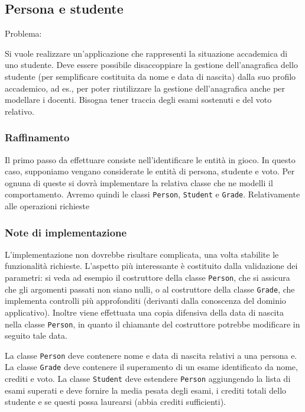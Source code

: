 \documentclass{article}
\begin{document}
\subsection{Persona e studente}

Problema:

Si vuole realizzare un'applicazione che rappresenti la situazione accademica di uno studente.
Deve essere possibile disaccoppiare la gestione dell'anagrafica dello studente (per semplificare
costituita da nome e data di nascita) dalla suo profilo accademico, ad es., per poter
riutilizzare la gestione dell'anagrafica anche per modellare i docenti.
Bisogna tener traccia degli esami sostenuti e del voto relativo.

\subsubsection{Raffinamento}
Il primo passo da effettuare consiste nell'identificare le entità in gioco.
In questo caso, supponiamo vengano considerate le entità di persona, studente e voto.
Per ognuna di queste si dovrà implementare la relativa classe che ne modelli il comportamento.
Avremo quindi le classi \texttt{Person}, \texttt{Student} e \texttt{Grade}.
Relativamente alle operazioni richieste

\subsubsection{Note di implementazione}

L'implementazione non dovrebbe risultare complicata, una volta stabilite
le funzionalità richieste.
L'aspetto più interessante è costituito dalla validazione dei parametri:
si veda ad esempio il costruttore della classe \texttt{Person}, che si assicura
che gli argomenti passati non siano nulli, o al costruttore della classe \texttt{Grade},
che implementa controlli più approfonditi (derivanti dalla conoscenza del dominio applicativo).
Inoltre viene effettuata una copia difensiva della data di nascita nella classe \texttt{Person},
in quanto il chiamante del costruttore potrebbe modificare in seguito tale data.

La classe \texttt{Person} deve contenere nome e data di nascita relativi a una persona e.
La classe \texttt{Grade} deve contenere il superamento di un esame identificato da nome, crediti e voto.
La classe \texttt{Student} deve estendere \texttt{Person} aggiungendo la lista di esami superati e deve
fornire la media pesata degli esami, i crediti totali dello studente e se questi possa laurearsi (abbia crediti sufficienti).
\end{document}
